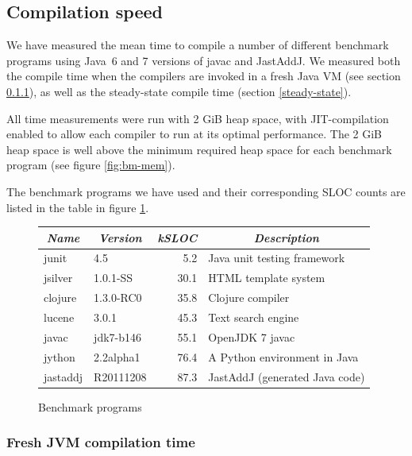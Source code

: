 {\subsection{Compilation speed}

We have measured the mean time to compile a number of different benchmark
programs using Java~6 and 7 versions of javac and JastAddJ. We measured both
the compile time when the compilers are invoked in a fresh Java VM (see section
\ref{fresh-jvm}), as well as the steady-state compile time (section
\ref{steady-state}).

All time measurements were run with 2 GiB heap space, with JIT-compilation
enabled to allow each compiler to run at its optimal performance. The 2 GiB
heap space is well above the minimum required heap space for each benchmark
program (see figure \ref{fig:bm-mem}).

The benchmark programs we have used and their corresponding SLOC counts are
listed in the table in figure \ref{fig:bm-programs}.

\begin{figure}[h]
\centering
\small
\begin{tabular}{|l|l|r|l|}
  \multicolumn{1}{c}{\emph{Name}} &
  \multicolumn{1}{c}{\emph{Version}} &
  \multicolumn{1}{c}{\emph{kSLOC}} &
  \multicolumn{1}{c}{\emph{Description}} \\
  \hline
  junit & 4.5 & 5.2 & Java unit testing framework \\
  jsilver & 1.0.1-SS & 30.1 & HTML template system \\
  clojure & 1.3.0-RC0 & 35.8 & Clojure compiler \\
  lucene & 3.0.1 & 45.3 & Text search engine \\
  javac & jdk7-b146 & 55.1 & OpenJDK 7 javac \\
  jython & 2.2alpha1 & 76.4 & A Python environment in Java \\
  jastaddj & R20111208 & 87.3 & JastAddJ (generated Java code)\\
  \hline
\end{tabular}
\caption{Benchmark programs}
\label{fig:bm-programs}
\end{figure}

\subsubsection{Fresh JVM compilation time}
\label{fresh-jvm}

}
